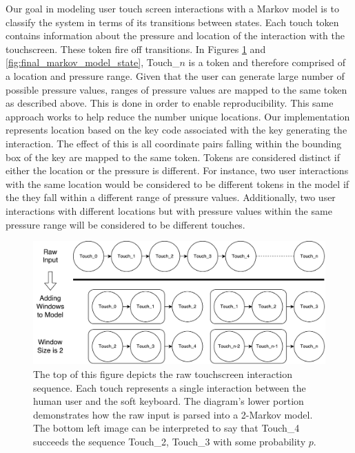 \documentclass{acm_proc_article-sp}
\begin{document}


Our goal in modeling user touch screen interactions with a Markov model
is to classify the system in terms of its transitions between states. 
Each touch token contains information about the pressure and location 
of the interaction with the touchscreen.
These token fire off transitions.
In Figures \ref{fig:markov_model_building} and \ref{fig:final_markov_model_state}, 
Touch\_$n$ is a token and therefore comprised of a location and pressure range.
%
Given that the user can generate large number of possible pressure values,
ranges of pressure values are mapped to the same token as described above.
This is done in order to enable reproducibility.
This same approach works to help reduce the number unique locations.
Our implementation represents location based
on the key code associated with the key generating the interaction.
The effect of this is 
all coordinate pairs falling within the bounding box
of the key are mapped to the same token.
%
Tokens are considered distinct if
either the location or the pressure is different.
For instance, two user interactions with the same location
would be considered to be different tokens in the model if
the they fall within a different range of pressure values.
Additionally, two user interactions with different locations but with pressure
values within the same pressure range will be considered to be different touches.

\begin{figure}
\centering
\includegraphics[width=.45\textwidth]{marcov_model_building.pdf}
\caption{
The top of this figure depicts the raw touchscreen interaction sequence.
Each touch represents a single interaction between the human user and the soft keyboard.
The diagram's lower portion demonstrates how the raw input is parsed into a 2-Markov model.
The bottom left image can be interpreted to say that Touch\_4 succeeds the sequence Touch\_2, Touch\_3 with some probability $p$.
}
\label{fig:markov_model_building}
\end{figure}
\end{document}
